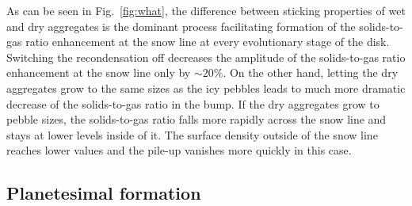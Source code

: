 \documentclass{aa}
\begin{document}
As can be seen in Fig.~\ref{fig:what}, the difference between sticking properties of wet and dry aggregates is the dominant process facilitating formation of the solids-to-gas ratio enhancement at the snow line at every evolutionary stage of the disk. Switching the recondensation off decreases the amplitude of the solids-to-gas ratio enhancement at the snow line only by $\sim20\%$. On the other hand, letting the dry aggregates grow to the same sizes as the icy pebbles leads to much more dramatic decrease of the solids-to-gas ratio in the bump. If the dry aggregates grow to pebble sizes, the solids-to-gas ratio falls more rapidly across the snow line and stays at lower levels inside of it. The surface density outside of the snow line reaches lower values and the pile-up vanishes more quickly in this case.

\subsection{Planetesimal formation}\label{sub:pf}
\end{document}
